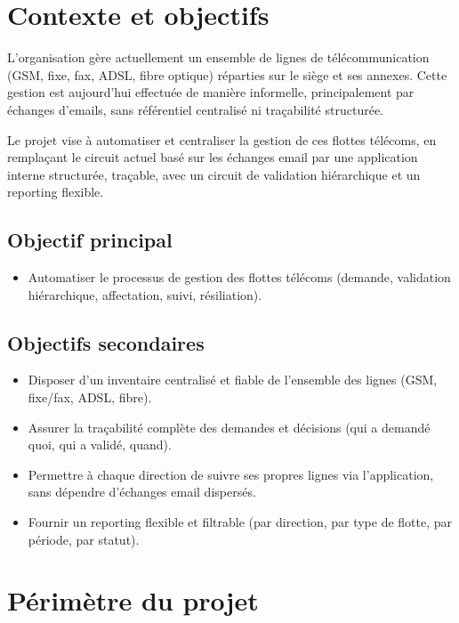\documentclass[11pt,a4paper]{article}
\begin{document}
\section{Contexte et objectifs}

L'organisation gère actuellement un ensemble de lignes de télécommunication (GSM, fixe, fax, ADSL, fibre optique) réparties sur le siège et ses annexes. Cette gestion est aujourd'hui effectuée de manière informelle, principalement par échanges d'emails, sans référentiel centralisé ni traçabilité structurée.

Le projet vise à automatiser et centraliser la gestion de ces flottes télécoms, en remplaçant le circuit actuel basé sur les échanges email par une application interne structurée, traçable, avec un circuit de validation hiérarchique et un reporting flexible.

\subsection{Objectif principal}
\begin{itemize}[leftmargin=*]
  \item Automatiser le processus de gestion des flottes télécoms (demande, validation hiérarchique, affectation, suivi, résiliation).
\end{itemize}

\subsection{Objectifs secondaires}
\begin{itemize}[leftmargin=*]
  \item Disposer d'un inventaire centralisé et fiable de l'ensemble des lignes (GSM, fixe/fax, ADSL, fibre).
  \item Assurer la traçabilité complète des demandes et décisions (qui a demandé quoi, qui a validé, quand).
  \item Permettre à chaque direction de suivre ses propres lignes via l'application, sans dépendre d'échanges email dispersés.
  \item Fournir un reporting flexible et filtrable (par direction, par type de flotte, par période, par statut).
\end{itemize}

\section{Périmètre du projet}
\end{document}
